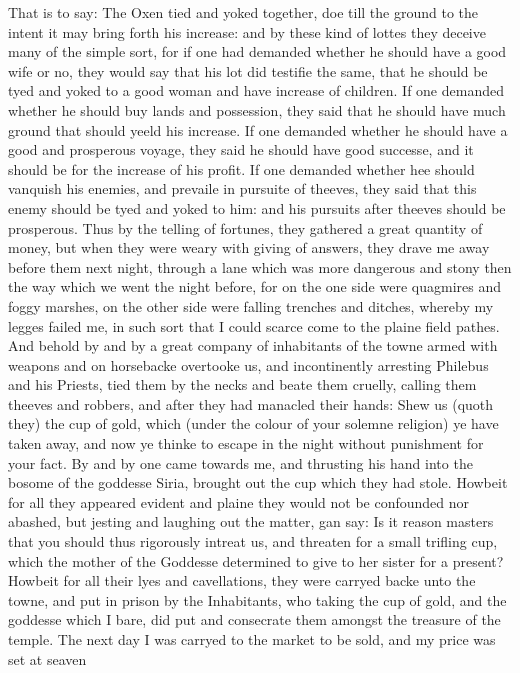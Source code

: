 That is to say: The Oxen tied and yoked together, doe till the ground to the
intent it may bring forth his increase: and by these kind of lottes they
deceive many of the simple sort, for if one had demanded whether he should have
a good wife or no, they would say that his lot did testifie the same, that he
should be tyed and yoked to a good woman and have increase of children. If one
demanded whether he should buy lands and possession, they said that he should
have much ground that should yeeld his increase. If one demanded whether he
should have a good and prosperous voyage, they said he should have good
successe, and it should be for the increase of his profit. If one demanded
whether hee should vanquish his enemies, and prevaile in pursuite of theeves,
they said that this enemy should be tyed and yoked to him: and his pursuits
after theeves should be prosperous. Thus by the telling of fortunes, they
gathered a great quantity of money, but when they were weary with giving of
answers, they drave me away before them next night, through a lane which was
more dangerous and stony then the way which we went the night before, for on
the one side were quagmires and foggy marshes, on the other side were falling
trenches and ditches, whereby my legges failed me, in such sort that I could
scarce come to the plaine field pathes. And behold by and by a great company of
inhabitants of the towne armed with weapons and on horsebacke overtooke us, and
incontinently arresting Philebus and his Priests, tied them by the necks and
beate them cruelly, calling them theeves and robbers, and after they had
manacled their hands: Shew us (quoth they) the cup of gold, which (under the
colour of your solemne religion) ye have taken away, and now ye thinke to
escape in the night without punishment for your fact. By and by one came
towards me, and thrusting his hand into the bosome of the goddesse Siria,
brought out the cup which they had stole. Howbeit for all they appeared evident
and plaine they would not be confounded nor abashed, but jesting and laughing
out the matter, gan say: Is it reason masters that you should thus rigorously
intreat us, and threaten for a small trifling cup, which the mother of the
Goddesse determined to give to her sister for a present? Howbeit for all their
lyes and cavellations, they were carryed backe unto the towne, and put in
prison by the Inhabitants, who taking the cup of gold, and the goddesse which I
bare, did put and consecrate them amongst the treasure of the temple. The next
day I was carryed to the market to be sold, and my price was set at seaven
